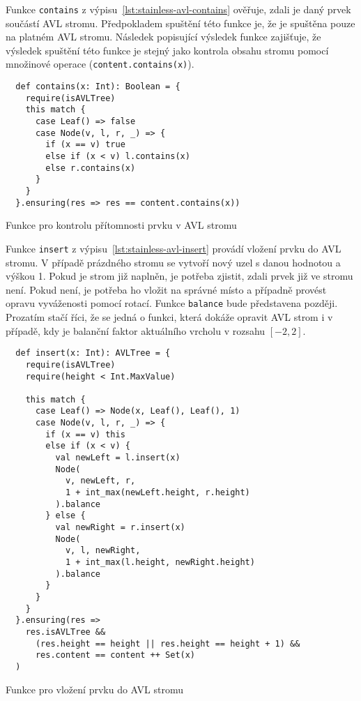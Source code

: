 Funkce \texttt{contains} z výpisu~\ref{lst:stainless-avl-contains}
ověřuje, zdali je daný prvek součástí AVL stromu.
Předpokladem spuštění této funkce je, že je spuštěna pouze na platném AVL stromu.
Následek popisující výsledek funkce zajišťuje,
že výsledek spuštění této funkce je stejný jako kontrola obsahu stromu pomocí množinové operace (\texttt{content.contains(x)}).

\begin{listing}[H]
  \begin{verbatim}
  def contains(x: Int): Boolean = {
    require(isAVLTree)
    this match {
      case Leaf() => false
      case Node(v, l, r, _) => {
        if (x == v) true
        else if (x < v) l.contains(x)
        else r.contains(x)
      }
    }
  }.ensuring(res => res == content.contains(x))
  \end{verbatim}
  \caption{Funkce pro kontrolu přítomnosti prvku v AVL stromu}
  \label{lst:stainless-avl-contains}
\end{listing}

Funkce \texttt{insert} z výpisu~\ref{lst:stainless-avl-insert}
provádí vložení prvku do AVL stromu.
V případě prázdného stromu se vytvoří nový uzel s danou hodnotou a výškou 1.
Pokud je strom již naplněn,
je potřeba zjistit, zdali prvek již ve stromu není.
Pokud není, je potřeba ho vložit na správné místo a případně provést opravu vyváženosti pomocí rotací.
Funkce \texttt{balance} bude představena později.
Prozatím stačí říci, že se jedná o funkci,
která dokáže opravit AVL strom i v případě,
kdy je balanční faktor aktuálního vrcholu v rozsahu $[-2, 2]$.

\begin{listing}[H]
  \begin{verbatim}
  def insert(x: Int): AVLTree = {
    require(isAVLTree)
    require(height < Int.MaxValue)

    this match {
      case Leaf() => Node(x, Leaf(), Leaf(), 1)
      case Node(v, l, r, _) => {
        if (x == v) this
        else if (x < v) {
          val newLeft = l.insert(x)
          Node(
            v, newLeft, r,
            1 + int_max(newLeft.height, r.height)
          ).balance
        } else {
          val newRight = r.insert(x)
          Node(
            v, l, newRight,
            1 + int_max(l.height, newRight.height)
          ).balance
        }
      }
    }
  }.ensuring(res =>
    res.isAVLTree &&
      (res.height == height || res.height == height + 1) &&
      res.content == content ++ Set(x)
  )
  \end{verbatim}
  \caption{Funkce pro vložení prvku do AVL stromu}
  \label{lst:stainless-avl-insert}
\end{listing}

